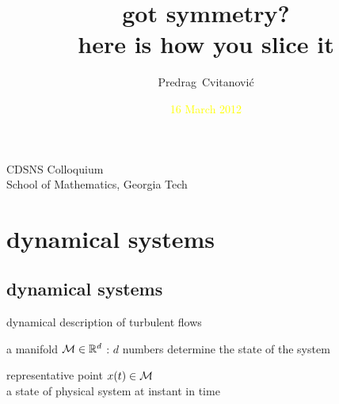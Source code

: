 





                          \date{\textcolor{yellow}{\scriptsize
 16 March 2012
                          }}

\title{{\Huge got symmetry?}
       \\
       {here is how you slice it}}
\author[Cvitanovi\'c]
{
  \textcolor{green!50!black}{
  {Predrag~Cvitanovi\'c}
  }
}
\institute
{
CDSNS Colloquium \\
School of Mathematics, Georgia Tech
}



\begin{frame}
  \titlepage
\end{frame}


\section[dynamical systems]{dynamical systems}

\subsection[dynamical systems]{dynamical systems}

\begin{frame}{dynamical description of turbulent flows}

\begin{block}{\statesp}
a manifold ${\cal M} \in \mathbb{R}^{d}$ :
$d$ numbers determine the state of the system
\end{block}

\bigskip

\begin{block}{representative point }
$x(t) \in {\cal M}$
\\
a state of physical system at instant in time
\end{block}
\end{frame}


